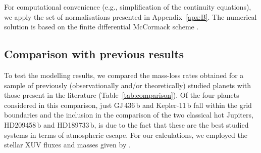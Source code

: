 \documentclass{aa}
\begin{document}
For computational convenience (e.g., simplification of the continuity equations), we apply the set of normalisations presented in Appendix~\ref{apx:B}. The numerical solution is based on the finite differential McCormack scheme \citep[Predictor-Corrector-Method; see][for more details]{erkaev2016}.
%
\subsection{Comparison with previous results}\label{sec:comparison}
%
To test the modelling results, we compared the mass-loss rates obtained for a sample of previously (observationally and/or theoretically) studied planets with those present in the literature (Table~\ref{tab:comparison}). Of the four planets considered in this comparison, just GJ\,436\,b and Kepler-11\,b fall within the grid boundaries and the inclusion in the comparison of the two classical hot Jupiters, HD209458\,b and HD189733\,b, is due to the fact that these are the best studied systems in terms of atmospheric escape. For our calculations, we employed the stellar XUV fluxes and masses given by \citet{guo2016}.
\end{document}

